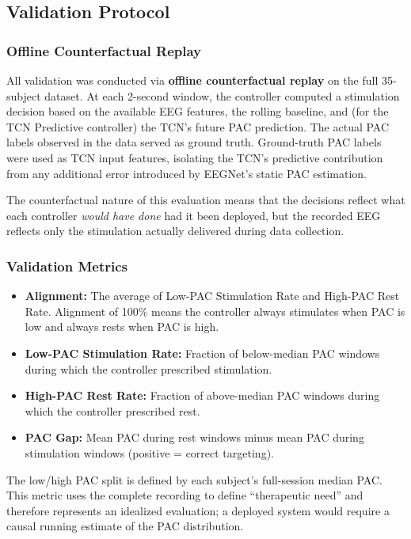 \documentclass[11pt,letterpaper]{article}
\begin{document}
\subsection{Validation Protocol}

\subsubsection{Offline Counterfactual Replay}

All validation was conducted via \textbf{offline counterfactual replay} on the full 35-subject dataset. At each 2-second window, the controller computed a stimulation decision based on the available EEG features, the rolling baseline, and (for the TCN Predictive controller) the TCN's future PAC prediction. The actual PAC labels observed in the data served as ground truth. Ground-truth PAC labels were used as TCN input features, isolating the TCN's predictive contribution from any additional error introduced by EEGNet's static PAC estimation.

The counterfactual nature of this evaluation means that the decisions reflect what each controller \textit{would have done} had it been deployed, but the recorded EEG reflects only the stimulation actually delivered during data collection.

\subsubsection{Validation Metrics}

\begin{itemize}[nosep]
  \item \textbf{Alignment:} The average of Low-PAC Stimulation Rate and High-PAC Rest Rate. Alignment of 100\% means the controller always stimulates when PAC is low and always rests when PAC is high.
  \item \textbf{Low-PAC Stimulation Rate:} Fraction of below-median PAC windows during which the controller prescribed stimulation.
  \item \textbf{High-PAC Rest Rate:} Fraction of above-median PAC windows during which the controller prescribed rest.
  \item \textbf{PAC Gap:} Mean PAC during rest windows minus mean PAC during stimulation windows (positive = correct targeting).
\end{itemize}

\noindent The low/high PAC split is defined by each subject's full-session median PAC. This metric uses the complete recording to define ``therapeutic need'' and therefore represents an idealized evaluation; a deployed system would require a causal running estimate of the PAC distribution.
\end{document}
